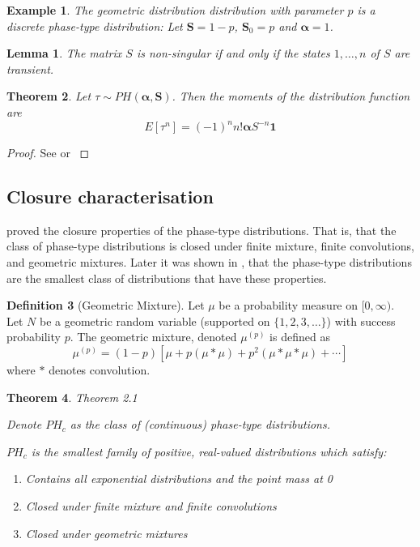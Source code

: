 \documentclass{article}
\theoremstyle{plain}
\newtheorem{theorem}{Theorem}[section]
\newtheorem{example}{Example}[theorem]
\newtheorem{lemma}[theorem]{Lemma}
\theoremstyle{definition}
\newtheorem{defn}[theorem]{Definition}
\theoremstyle{remark}
\numberwithin{equation}{section}
\begin{document}
\begin{example}
The geometric distribution distribution with parameter $p$ is a discrete phase-type distribution:
Let $\mathbf S = 1 - p$, $\mathbf{S}_0 = p$ and $\boldsymbol{\alpha} = 1$.
\end{example}

\begin{lemma}\cite{neuts1981}
The matrix $S$ is non-singular if and only if the states $1,\ldots, n$ of $S$ are transient.
\end{lemma}

\begin{theorem}
Let $\tau \sim PH(\boldsymbol{\alpha}, \mathbf{S})$.
Then the moments of the distribution function are
$$
E[\tau^{{n}}]=(-1)^{{n}}n!{\boldsymbol  {\alpha }}{S}^{{-n}}{\mathbf  {1}}
$$
\end{theorem}

\begin{proof}
See \cite{neuts1981} or \cite{mle_phase_type2011}
\end{proof}

\subsection{Closure characterisation}

\cite{neuts1975} proved the closure properties of the phase-type distributions.
That is, that the class of phase-type distributions is closed under finite mixture, finite convolutions, and geometric mixtures.
Later it was shown in \cite{maier1992}, that the phase-type distributions are the smallest class of distributions that have these properties.

\begin{defn}[Geometric Mixture] \cite{maier1992}
Let $\mu$ be a probability measure on $[0, \infty)$.
Let $N$ be a geometric random variable (supported on $\{1,2,3,\ldots\}$) with success probability $p$.
The geometric mixture, denoted $\mu^{(p)}$ is defined as
$$
\mu^{(p)} = (1 - p) [\mu + p (\mu * \mu) + p^2 (\mu * \mu * \mu) + \cdots]
$$
where $*$ denotes convolution.
\end{defn}

\begin{theorem}\cite{maier1992} Theorem 2.1

Denote $PH_c$ as the class of (continuous) phase-type distributions.

$PH_c$ is the smallest family of positive, real-valued distributions which satisfy:
\begin{enumerate}
    \item Contains all exponential distributions and the point mass at 0
    \item Closed under finite mixture and finite convolutions
    \item Closed under geometric mixtures
\end{enumerate}
\end{theorem}
\end{document}
